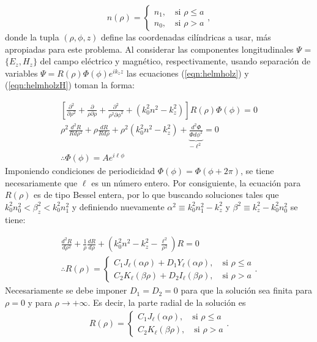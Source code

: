 \begin{equation}
	n( \rho ) = 
	\left\{\begin{matrix}
	n_1, \quad \text{si } \rho \le a
	\\
	n_0, \quad \text{si } \rho > a
	\end{matrix}\right.
	,\nonumber
\end{equation}
donde la tupla $(\rho, \phi, z)$ define las coordenadas cilíndricas a usar, más apropiadas para este problema. Al considerar las componentes longitudinales $\Psi$ = $\{E_z, H_z\}$ del campo eléctrico y magnético, respectivamente, usando separación de variables $\Psi =  R(\rho)\Phi(\phi) e^{ik_z z} $ las ecuaciones (\ref{eqn:helmholz}) y (\ref{eqn:helmholzH}) toman la forma:

\begin{align}
	\left[\frac{\partial^2}{\partial \rho^2} + \frac{\partial}{\rho\partial \rho} + \frac{\partial^2}{\rho^2\partial \phi^2} +\left( k_0^2n^2 - k_z^2 \right)\right]  R(\rho)\Phi(\phi) = 0
	\nonumber
	\\
\rho^2\frac{d^2 R}{Rd\rho^2} + \rho\frac{dR}{Rd\rho} + \rho^2\left( k_0^2n^2 - k_z^2 \right) + \underbrace{\frac{d^2 \Phi}{\Phi d\phi^2}}_{-\ell^2} = 0
\nonumber
\\
\therefore \Phi(\phi) = A e^{i\ell\phi}
\nonumber
\end{align}
Imponiendo condiciones de periodicidad $\Phi(\phi)=\Phi(\phi + 2\pi)$, se tiene necesariamente que $\ell$ es un número entero. Por consiguiente, la ecuación para $R(\rho)$ es de tipo Bessel entera, por lo que buscando soluciones tales que $k_0^2 n_0^2 < \beta_z^2 < k_0^2 n_1^2$ y definiendo nuevamente $\alpha^2 \equiv k_0^2n_1^2 - k_z^2$ y $\beta^2\equiv k_z^2 - k_0^2n_0^2$ se tiene:

\begin{align}
	\frac{d^2 R}{d\rho^2} + \frac{1}{\rho}\frac{dR}{d\rho} + \left( k_0^2n^2 - k_z^2 -\frac{\ell^2}{\rho^2}\right)R  = 0
	\nonumber
	\\
	\therefore R(\rho) = 
	\left\{
	\begin{matrix}	
	C_1 J_\ell (\alpha\rho) + D_1 Y_\ell (\alpha\rho), \quad \text{si } \rho \le a  
	\\
	C_2 K_\ell (\beta\rho) + D_2 I_\ell (\beta\rho), \quad \text{si } \rho > a  
	\end{matrix}
	\right.
	. \nonumber
\end{align}
Necesariamente se debe imponer $D_1 = D_2 = 0$ para que la solución sea finita para $\rho = 0$ y para $\rho \to +\infty$. Es decir, la parte radial de la solución es
\begin{align*}
 R(\rho) = 
	\left\{
	\begin{matrix}	
	C_1 J_\ell (\alpha\rho), \quad \text{si } \rho \le a  
	\\
	C_2 K_\ell (\beta\rho), \quad \text{si } \rho > a  
	\end{matrix}
	\right.
	. \nonumber
\end{align*}


